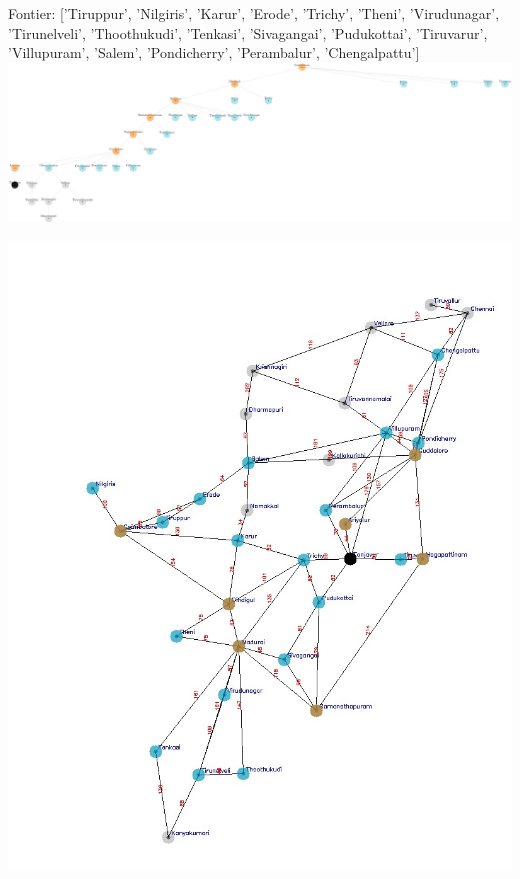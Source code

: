 \documentclass[xcolor=table]{beamer}
\begin{document}
\begin{frame}
  { \tiny Fontier: ['Tiruppur', 'Nilgiris', 'Karur', 'Erode', 'Trichy', 'Theni', 'Virudunagar', 'Tirunelveli', 'Thoothukudi', 'Tenkasi', 'Sivagangai', 'Pudukottai', 'Tiruvarur', 'Villupuram', 'Salem', 'Pondicherry', 'Perambalur', 'Chengalpattu']}
  \includegraphics[width=1\textwidth]{../DFSNodes/11-1.png}
  \begin{center}
    \includegraphics[height=0.45\textheight]{../DFSoutput/tamilDFS9.jpg}
  \end{center}
\end{frame}
\end{document}
